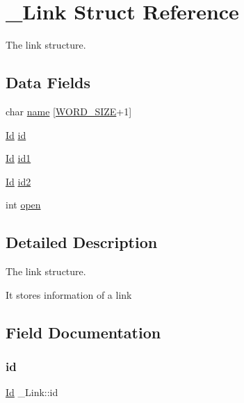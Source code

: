 \hypertarget{struct__Link}{}\section{\+\_\+\+Link Struct Reference}
\label{struct__Link}


The link structure.  


\subsection*{Data Fields}
\begin{DoxyCompactItemize}
\item 
char \hyperlink{struct__Link_a020ee863120055b29609157b9de3c84d}{name} \mbox{[}\hyperlink{types_8h_a92ed8507d1cd2331ad09275c5c4c1c89}{W\+O\+R\+D\+\_\+\+S\+I\+ZE}+1\mbox{]}
\item 
\hyperlink{types_8h_a845e604fb28f7e3d97549da3448149d3}{Id} \hyperlink{struct__Link_a151212e7a8e8274c2a1ee991ba95878b}{id}
\item 
\hyperlink{types_8h_a845e604fb28f7e3d97549da3448149d3}{Id} \hyperlink{struct__Link_a62d6aee205ac5d4d738bb7448fbaf9cc}{id1}
\item 
\hyperlink{types_8h_a845e604fb28f7e3d97549da3448149d3}{Id} \hyperlink{struct__Link_a9d8710f0f005598c8d6a1b48d5bf07d7}{id2}
\item 
int \hyperlink{struct__Link_a5df9107f4ea513f3741d9e4883f4678a}{open}
\end{DoxyCompactItemize}


\subsection{Detailed Description}
The link structure. 

It stores information of a link 

\subsection{Field Documentation}
\mbox{\label{struct__Link_a151212e7a8e8274c2a1ee991ba95878b}} 
\subsubsection{\texorpdfstring{id}{id}}
{\footnotesize\ttfamily \hyperlink{types_8h_a845e604fb28f7e3d97549da3448149d3}{Id} \+\_\+\+Link\+::id}

